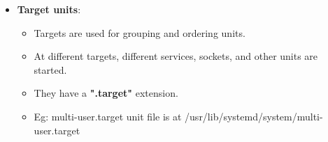 \begin{flushleft}
\begin{itemize}
\begin{itemize}
		\end{itemize}
		\bigskip \bigskip
		\item \textbf{Target units}:
		\begin{itemize}
			\item Targets are used for grouping and ordering units. 
			\item At different targets, different services, sockets, and other units are started.
			\item They have a \textbf{".target"} extension.
			\item Eg: multi-user.target unit file is at /usr/lib/systemd/system/multi-user.target
		\end{itemize}
		

	\end{itemize}
	
\end{flushleft}

\newpage

